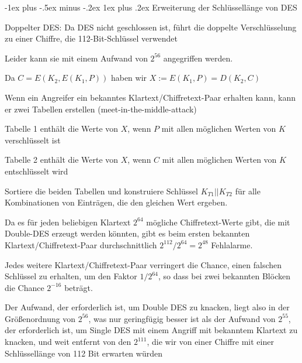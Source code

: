 \documentclass[a4paper]{article}
\makeatletter
\renewcommand{\subsubsection}{\@startsection{subsubsection}{3}{0mm}%
 {-1ex plus -.5ex minus -.2ex}%
 {1ex plus .2ex}%
 {\normalfont\small\bfseries}}
\makeatother
\begin{document}
\begin{multicols}{3}
      \subsubsection{Erweiterung der Schlüssellänge von DES}
      \begin{itemize*}
            \item Doppelter DES: Da DES nicht geschlossen ist, führt die doppelte Verschlüsselung zu einer Chiffre, die 112-Bit-Schlüssel verwendet
            \begin{itemize*}
                  \item Leider kann sie mit einem Aufwand von $2^{56}$ angegriffen werden.
                  \item Da $C=E(K_2,E(K_1,P))$ haben wir $X:=E(K_1,P)=D(K_2,C)$
                  \item Wenn ein Angreifer ein bekanntes Klartext/Chiffretext-Paar erhalten kann, kann er zwei Tabellen erstellen (meet-in-the-middle-attack)
                  \begin{itemize*}
                        \item Tabelle 1 enthält die Werte von $X$, wenn $P$ mit allen möglichen Werten von $K$ verschlüsselt ist
                        \item Tabelle 2 enthält die Werte von $X$, wenn $C$ mit allen möglichen Werten von $K$ entschlüsselt wird
                        \item Sortiere die beiden Tabellen und konstruiere Schlüssel $K_{T1}|| K_{T2}$ für alle Kombinationen von Einträgen, die den gleichen Wert ergeben.
                  \end{itemize*}
            \end{itemize*}
            \item Da es für jeden beliebigen Klartext $2^{64}$ mögliche Chiffretext-Werte gibt, die mit Double-DES erzeugt werden könnten, gibt es beim ersten bekannten Klartext/Chiffretext-Paar durchschnittlich $2^{112}/2^{64}=2^{48}$ Fehlalarme.
            \item Jedes weitere Klartext/Chiffretext-Paar verringert die Chance, einen falschen Schlüssel zu erhalten, um den Faktor $1/2^{64}$, so dass bei zwei bekannten Blöcken die Chance $2^{-16}$ beträgt.
            \item Der Aufwand, der erforderlich ist, um Double DES zu knacken, liegt also in der Größenordnung von $2^{56}$, was nur geringfügig besser ist als der Aufwand von $2^{55}$, der erforderlich ist, um Single DES mit einem Angriff mit bekanntem Klartext zu knacken, und weit entfernt von den $2^{111}$, die wir von einer Chiffre mit einer Schlüssellänge von 112 Bit erwarten würden

\end{itemize*}
\end{multicols}
\end{document}
